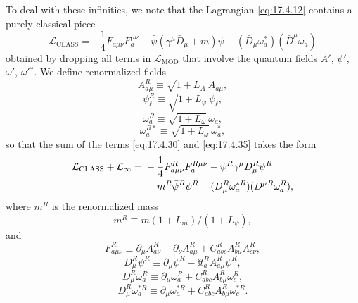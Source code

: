 To deal with these infinities, we note that the Lagrangian \eqref{eq:17.4.12}
contains a purely classical piece
\begin{equation}
\mathcal L_{\mathrm{CLASS}}
=-\frac14F_{a\mu\nu}F_a^{\mu\nu}
-\bar\psi(\gamma^\mu\bar D_\mu+m)\psi
-(\bar D_\mu\omega_a^*)(\bar D^\mu\omega_a)
\label{eq:17.4.35}
\end{equation}
obtained by dropping all terms in $\mathcal L_{\mathrm{MOD}}$ that involve
the quantum fields $A'$, $\psi'$, $\omega'$, $\omega'{}^*$. We define
renormalized fields
\begin{equation}
A_{a\mu}^R\equiv\sqrt{1+L_A}\,A_{a\mu},
\label{eq:17.4.36}
\end{equation}
\begin{equation}
\psi_\ell^R\equiv\sqrt{1+L_\psi}\,\psi_\ell,
\label{eq:17.4.37}
\end{equation}
\begin{equation}
\omega_a^R\equiv\sqrt{1+L_\omega}\,\omega_a,
\label{eq:17.4.38}
\end{equation}
\begin{equation}
\omega_a^{R*}\equiv\sqrt{1+L_\omega}\,\omega_a^*,
\label{eq:17.4.39}
\end{equation}
so that the sum of the terms \eqref{eq:17.4.30} and \eqref{eq:17.4.35}
takes the form
\begin{align}
\mathcal L_{\mathrm{CLASS}}+\mathcal L_\infty
={}&-\frac14F_{a\mu\nu}^R F_a^{R\mu\nu}
-\bar\psi^R\gamma^\mu D_\mu^R\psi^R \notag\\
&-m^R\bar\psi^R\psi^R
-(D_\mu^R\omega_a^{*R})(D^{\mu R}\omega_a^R),
\label{eq:17.4.40}
\end{align}
where $m^R$ is the renormalized mass
\begin{equation}
m^R\equiv m(1+L_m)/(1+L_\psi),
\label{eq:17.4.41}
\end{equation}
and
\begin{equation}
F_{a\mu\nu}^R\equiv
\partial_\mu A_{a\nu}^R-\partial_\nu A_{a\mu}^R
+C_{abc}^R A_{b\mu}^R A_{c\nu}^R,
\label{eq:17.4.42}
\end{equation}
\begin{equation}
D_\mu^R\psi^R\equiv
\partial_\mu\psi^R-\ii t_a^R A_{a\mu}^R\psi^R,
\label{eq:17.4.43}
\end{equation}
\begin{equation}
D_\mu^R\omega_a^R\equiv
\partial_\mu\omega_a^R
+C_{abc}^R A_{b\mu}^R\omega_c^R,
\label{eq:17.4.44}
\end{equation}
\begin{equation}
D_\mu^R\omega_a^{*R}\equiv
\partial_\mu\omega_a^{*R}
+C_{abc}^R A_{b\mu}^R\omega_c^{*R}.
\label{eq:17.4.45}
\end{equation}
